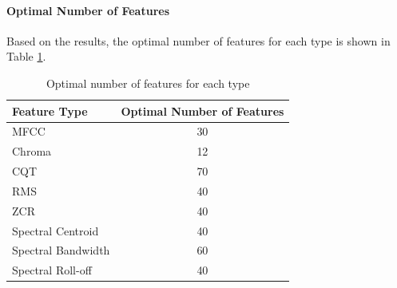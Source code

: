 \paragraph{Optimal Number of Features}

Based on the results, the optimal number of features for each type is shown in Table \ref{tab:optimal_features}.
\begin{table}[h]
    \centering
    \small
    \begin{tabular}{|lc|}
        \hline
        \textbf{Feature Type} & \textbf{Optimal Number of Features} \\
        \hline
        MFCC                  & 30                                  \\
        Chroma                & 12                                  \\
        CQT                   & 70                                  \\
        RMS                   & 40                                  \\
        ZCR                   & 40                                  \\
        Spectral Centroid     & 40                                  \\
        Spectral Bandwidth    & 60                                  \\
        Spectral Roll-off     & 40                                  \\
        \hline
    \end{tabular}
    \caption{Optimal number of features for each type}
    \label{tab:optimal_features}
\end{table}